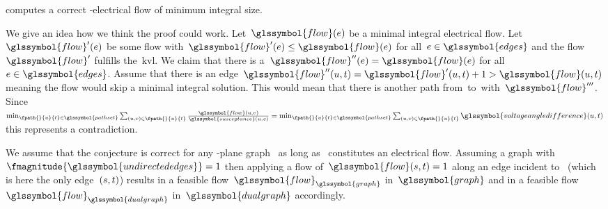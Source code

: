 % 
\begin{conjecture}
     computes a
    correct \source-\sink electrical flow of minimum integral size.
    \label{ch:network-analyzes:lem:minimum-integer-flow}%
\end{conjecture}
% 
We give an idea how we think the proof could work.
% 
    Let~$\glssymbol{flow}(\edge)$ be a minimal integral electrical flow. Let~$
    \glssymbol{flow}'(\edge)$ be some flow with~$ %
        \glssymbol{flow}'(\edge) 
        \leq 
        \glssymbol{flow}(\edge)
    $ for all~$\edge\in\glssymbol{edges}$ and the flow~$\glssymbol{flow}'$
    fulfills the~\gls{kvl}. We claim that there is a~$
        \glssymbol{flow}''(\edge)
        =
        \glssymbol{flow}(\edge)
    $ for all~$\edge\in\glssymbol{edges}$. Assume that there is an edge~$
        \glssymbol{flow}''(\vertexa,\sink) 
        = 
        \glssymbol{flow}'(\vertexa,\sink) 
        + 1
        >
        \glssymbol{flow}(\vertexa,\sink) 
    $ meaning the flow would skip a minimal integral solution. This would mean
    that there is another path from~\vertexa to~\sink with~$
    \glssymbol{flow}'''$. Since~$
        \min_{\fpath{}{\vertexa}{\sink}\in\glssymbol{pathset} } 
        \sum_{(\vertexa,\vertexb)\in\fpath{}{\vertexa}{\sink}}
        \frac{ 
            \glssymbol{flow}(\vertexa,\vertexb) 
        }{ 
            \glssymbol{susceptance}(\vertexa,\vertexb) 
        }
        =
        \min_{\fpath{}{\vertexa}{\sink}\in\glssymbol{pathset} } 
        \sum_{(\vertexa,\vertexb)\in\fpath{}{\vertexa}{\sink}}
        \glssymbol{voltageangledifference}(\vertexa,\sink)
    $ this represents a contradiction.

    We assume that the conjecture is correct for any \source-\sink plane
    graph~ as long as~ constitutes an
    electrical flow. Assuming a graph with~$
    \fmagnitude{\glssymbol{undirectededges}} = 1$ then applying a flow
    of~$\glssymbol{flow}(\source,\sink) = 1$ along an edge incident to~\source
    (which is here the only edge~$ (s,t)$) results in a feasible
    flow~$\glssymbol{flow}_{\glssymbol{graph}}$ in~$\glssymbol{graph}$ and in a
    feasible flow~$\glssymbol{flow}_{\glssymbol{dualgraph}}$
    in~$\glssymbol{dualgraph}$ accordingly.


